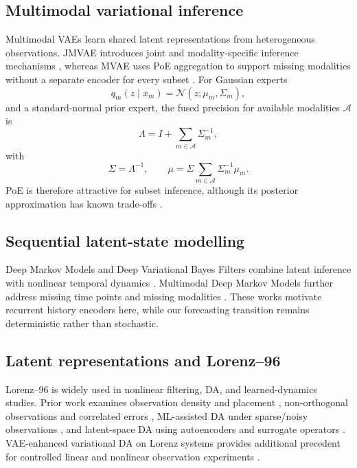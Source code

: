 \documentclass[10pt,twocolumn]{article}
\begin{document}
\subsection{Multimodal variational inference}
Multimodal VAEs learn shared latent representations from heterogeneous observations. JMVAE introduces joint and modality-specific inference mechanisms \citep{suzuki2017joint}, whereas MVAE uses PoE aggregation to support missing modalities without a separate encoder for every subset \citep{wu2018multimodal}. For Gaussian experts
\begin{equation}
q_m(z\mid x_m)=\mathcal{N}(z;\mu_m,\Sigma_m),
\end{equation}
and a standard-normal prior expert, the fused precision for available modalities $\mathcal{A}$ is
\begin{equation}
\Lambda = I+\sum_{m\in\mathcal{A}}\Sigma_m^{-1},
\end{equation}
with
\begin{equation}
\Sigma=\Lambda^{-1}, \qquad
\mu=\Sigma\sum_{m\in\mathcal{A}}\Sigma_m^{-1}\mu_m.
\end{equation}
PoE is therefore attractive for subset inference, although its posterior approximation has known trade-offs \citep{sutter2021generalized}.

\subsection{Sequential latent-state modelling}
Deep Markov Models and Deep Variational Bayes Filters combine latent inference with nonlinear temporal dynamics \citep{krishnan2017structured,karl2017deep}. Multimodal Deep Markov Models further address missing time points and missing modalities \citep{tan2020factorized}. These works motivate recurrent history encoders here, while our forecasting transition remains deterministic rather than stochastic.

\subsection{Latent representations and Lorenz--96}
Lorenz--96 is widely used in nonlinear filtering, DA, and learned-dynamics studies. Prior work examines observation density and placement \citep{law2016determining}, non-orthogonal observations and correlated errors \citep{terasaki2014effective}, ML-assisted DA under sparse/noisy observations \citep{brajard2020combining}, and latent-space DA using autoencoders and surrogate operators \citep{peyron2021latent}. VAE-enhanced variational DA on Lorenz systems provides additional precedent for controlled linear and nonlinear observation experiments \citep{xiao2025vaevar}.
\end{document}
